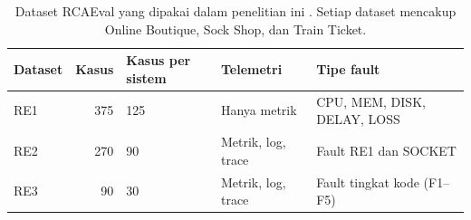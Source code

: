 \begin{table}
\caption{Dataset RCAEval yang dipakai dalam penelitian ini \cite{pham2024rcaeval}. Setiap dataset mencakup Online Boutique, Sock Shop, dan Train Ticket.}\label{tab:datasets}
\centering
\small
\begin{tabular}{lrlll}
\toprule
Dataset & Kasus & Kasus per sistem & Telemetri & Tipe fault\\
\midrule
RE1 & 375 & 125 & Hanya metrik & CPU, MEM, DISK, DELAY, LOSS\\
RE2 & 270 & 90 & Metrik, log, trace & Fault RE1 dan SOCKET\\
RE3 & 90 & 30 & Metrik, log, trace & Fault tingkat kode (F1--F5)\\
\bottomrule
\end{tabular}
\end{table}
